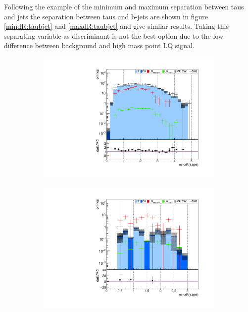 %
Following the example of the minimum and maximum separation between taus and jets the separation between taus and b-jets are shown in figure \ref{mindR:taubjet} and \ref{maxdR:taubjet} and give similar results. Taking this separating variable as discriminant is not the best option due to the low difference between background and high mass point LQ signal.\par 
%
\begin{figure}
  \centering
                \begin{subfigure}[t]{0.49\textwidth}
                \includegraphics[width=\textwidth]{figures/plots/kinLQ75/mindR_taubjet_2j2b_1tau.pdf}
                \label{mindR:taubjet:2b1tau}
                \end{subfigure}
                \begin{subfigure}[t]{0.49\textwidth}
                \includegraphics[width=\textwidth]{figures/plots/kinLQ75/mindR_taubjet_2j2b_2tau.pdf}

\end{subfigure}
\end{figure}
